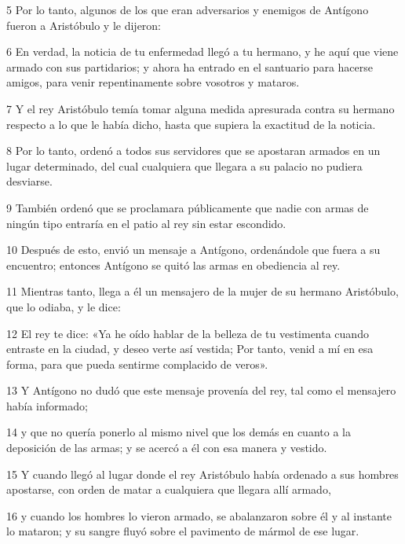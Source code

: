 \par 5 Por lo tanto, algunos de los que eran adversarios y enemigos de Antígono fueron a Aristóbulo y le dijeron:

\par 6 En verdad, la noticia de tu enfermedad llegó a tu hermano, y he aquí que viene armado con sus partidarios; y ahora ha entrado en el santuario para hacerse amigos, para venir repentinamente sobre vosotros y mataros.

\par 7 Y el rey Aristóbulo temía tomar alguna medida apresurada contra su hermano respecto a lo que le había dicho, hasta que supiera la exactitud de la noticia.

\par 8 Por lo tanto, ordenó a todos sus servidores que se apostaran armados en un lugar determinado, del cual cualquiera que llegara a su palacio no pudiera desviarse.

\par 9 También ordenó que se proclamara públicamente que nadie con armas de ningún tipo entraría en el patio al rey sin estar escondido.

\par 10 Después de esto, envió un mensaje a Antígono, ordenándole que fuera a su encuentro; entonces Antígono se quitó las armas en obediencia al rey.

\par 11 Mientras tanto, llega a él un mensajero de la mujer de su hermano Aristóbulo, que lo odiaba, y le dice:

\par 12 El rey te dice: «Ya he oído hablar de la belleza de tu vestimenta cuando entraste en la ciudad, y deseo verte así vestida; Por tanto, venid a mí en esa forma, para que pueda sentirme complacido de veros».

\par 13 Y Antígono no dudó que este mensaje provenía del rey, tal como el mensajero había informado;

\par 14 y que no quería ponerlo al mismo nivel que los demás en cuanto a la deposición de las armas; y se acercó a él con esa manera y vestido.

\par 15 Y cuando llegó al lugar donde el rey Aristóbulo había ordenado a sus hombres apostarse, con orden de matar a cualquiera que llegara allí armado,

\par 16 y cuando los hombres lo vieron armado, se abalanzaron sobre él y al instante lo mataron; y su sangre fluyó sobre el pavimento de mármol de ese lugar.

